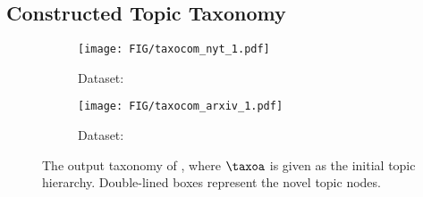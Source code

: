 

\subsection{Constructed Topic Taxonomy}
\label{subsec:outputtaxo}

\begin{figure}[h]
\centering
\begin{subfigure}{\linewidth}
    \centering
    \texttt{[image: FIG/taxocom\_nyt\_1.pdf]}  
    \caption{Dataset: \nyt}
\end{subfigure}
\begin{subfigure}{\linewidth}
    \centering
    \texttt{[image: FIG/taxocom\_arxiv\_1.pdf]}
    \caption{Dataset: \arxiv}
\end{subfigure}
\caption{The output taxonomy of \proposed, where $\taxoa$ is given as the initial topic hierarchy. Double-lined boxes represent the novel topic nodes.}
\label{fig:taxoa}
\end{figure}

